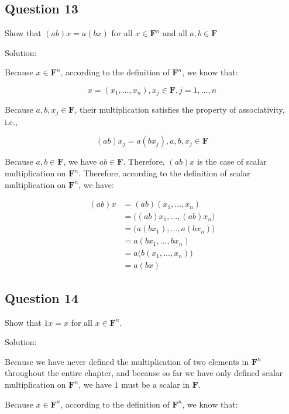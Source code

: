 \documentclass[12pt, letterpaper, oneside]{book}
\begin{document}
\subsection{Question 13}

Show that $(ab)x = a(bx)$ for all $x \in \mathbf{F}^n$ and all $a, b \in
  \mathbf{F}$

Solution:

Because $x \in \mathbf{F}^n$, according to the definition of $\mathbf{F}^n$, we
know that:

\[ x = (x_1, \ldots, x_n), x_j \in \mathbf{F}, j = 1, \ldots, n \]

Because $a, b, x_j \in \mathbf{F}$, their multiplication satisfies the property
of associativity, i.e.,

\[ (ab)x_j = a(b x_j), a, b, x_j \in \mathbf{F} \]

Because $a, b \in \mathbf{F}$, we have $ab \in \mathbf{F}$. Therefore, $(ab)x$
is the case of scalar multiplication on $\mathbf{F}^n$. Therefore, according to
the definition of scalar multiplication on $\mathbf{F}^n$, we have:

\begin{equation*}
  \begin{split}
    (ab)x
    & = (ab)(x_1, \ldots, x_n) \\
    & = \bigl((ab)x_1, \ldots, (ab)x_n\bigr) \\
    & = \bigl(a(b x_1), \ldots, a(b x_n)\bigr) \\
    & = a(b x_1, \ldots, b x_n) \\
    & = a\bigl(b(x_1, \ldots, x_n)\bigr) \\
    & = a(bx)
  \end{split}
\end{equation*}

\subsection{Question 14}

Show that $1x = x$ for all $x \in \mathbf{F}^n$.

Solution:

Because we have never defined the multiplication of two elements in
$\mathbf{F}^n$ throughout the entire chapter, and because so far we have only
defined scalar multiplication on $\mathbf{F}^n$, we have $1$ must be a scalar
in $\mathbf{F}$.

Because $x \in \mathbf{F}^n$, according to the definition of $\mathbf{F}^n$, we
know that:
\end{document}
